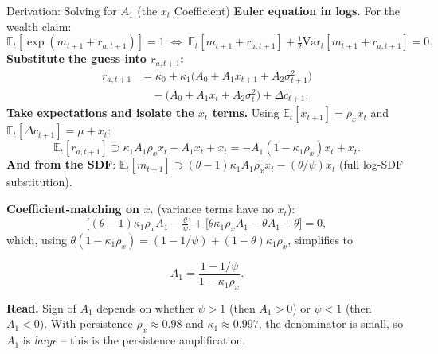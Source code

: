 \documentclass{beamer}
\newcommand{\E}{\mathbb{E}}
\newcommand{\Var}{\mathrm{Var}}
\begin{document}
\begin{frame}{Derivation: Solving for $A_1$ (the $x_t$ Coefficient)}
    \textbf{Euler equation in logs.} For the wealth claim:
    \begin{equation*}
        \E_t[\exp(m_{t+1}+r_{a,t+1})] = 1 \;\Leftrightarrow\; \E_t[m_{t+1}+r_{a,t+1}] + \tfrac{1}{2}\Var_t[m_{t+1}+r_{a,t+1}] = 0.
    \end{equation*}
    \textbf{Substitute the guess into $r_{a,t+1}$:}
    \begin{align*}
        r_{a,t+1} &= \kappa_0 + \kappa_1\bigl(A_0+A_1 x_{t+1}+A_2\sigma_{t+1}^2\bigr) \\
        &\quad - \bigl(A_0+A_1 x_t+A_2\sigma_t^2\bigr) + \Delta c_{t+1}.
    \end{align*}
    \textbf{Take expectations and isolate the $x_t$ terms.} Using $\E_t[x_{t+1}] = \rho_x x_t$ and $\E_t[\Delta c_{t+1}] = \mu+x_t$:
    \begin{equation*}
        \E_t[r_{a,t+1}] \supset \kappa_1 A_1 \rho_x x_t - A_1 x_t + x_t = -A_1(1-\kappa_1\rho_x)x_t + x_t.
    \end{equation*}
    \textbf{And from the SDF}: $\E_t[m_{t+1}]\supset (\theta-1)\kappa_1 A_1\rho_x x_t - (\theta/\psi)x_t$ (full log-SDF substitution).

    \framebreak

    \textbf{Coefficient-matching on $x_t$} (variance terms have no $x_t$):
    \begin{equation*}
    	\bigl[(\theta-1)\kappa_1\rho_x A_1 - \tfrac{\theta}{\psi}\bigr] + \bigl[\theta\kappa_1\rho_x A_1 - \theta A_1 + \theta\bigr] = 0,
    \end{equation*}
    which, using $\theta(1-\kappa_1\rho_x) = (1-1/\psi) + (1-\theta)\kappa_1\rho_x$, simplifies to
    \begin{tcolorbox}[colback=blue!5!white, colframe=blue!75!black, title=Closed Form for $A_1$]
    \begin{equation}
        A_1 = \frac{1-1/\psi}{1-\kappa_1\rho_x}.
    \end{equation}
    \end{tcolorbox}
    \textbf{Read.} Sign of $A_1$ depends on whether $\psi > 1$ (then $A_1 > 0$) or $\psi < 1$ (then $A_1 < 0$). With persistence $\rho_x \approx 0.98$ and $\kappa_1 \approx 0.997$, the denominator is small, so $A_1$ is \emph{large} -- this is the persistence amplification.
\end{frame}
\end{document}
